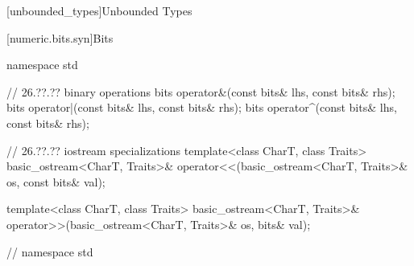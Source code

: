
[unbounded_types]{Unbounded Types}


%
[numeric.bits.syn]{Bits}

\begin{codeblock}
namespace std {
  
  // 26.??.?? binary operations
  bits operator&(const bits& lhs, const bits& rhs);
  bits operator|(const bits& lhs, const bits& rhs);
  bits operator^(const bits& lhs, const bits& rhs);
  
  // 26.??.?? iostream specializations
  template<class CharT, class Traits>
    basic_ostream<CharT, Traits>& operator<<(basic_ostream<CharT, Traits>& os,
                                             const bits& val);
  
  template<class CharT, class Traits>
    basic_ostream<CharT, Traits>& operator>>(basic_ostream<CharT, Traits>& os,
                                             bits& val);

} // namespace std
\end{codeblock}
       
